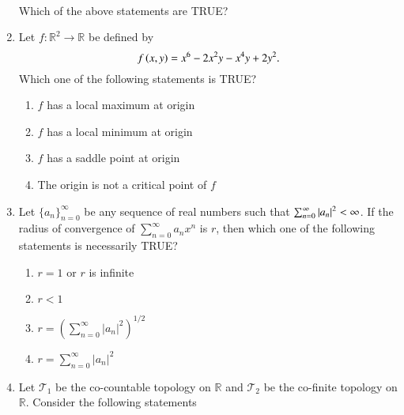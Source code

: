 \documentclass[journal,12pt,onecolumn]{IEEEtran}
\theoremstyle{remark}
\begin{document}
\begin{enumerate}[start=1, label=Q.\arabic*]
 \\
Which of the above statements are TRUE?
\begin{enumerate}
\end{enumerate}

\hfill{}


\item Let $f : \mathbb{R}^2 \to \mathbb{R}$ be defined by
\[
f\left(x,y\right) = x^6 - 2x^2 y - x^4 y + 2y^2.
\]
Which one of the following statements is TRUE?
\begin{enumerate}
\item $f$ has a local maximum at origin
\item $f$ has a local minimum at origin
\item $f$ has a saddle point at origin
\item The origin is not a critical point of $f$
\end{enumerate}

\hfill{}

\item Let \(\{a_n\}_{n=0}^{\infty}\) be any sequence of real numbers such that \(\sum_{n=0}^{\infty} \left\vert a_n\right\vert^2 < \infty\).
If the radius of convergence of \(\sum_{n=0}^{\infty} a_n x^n\) is \(r\), then which one of the following statements is necessarily TRUE?
\begin{enumerate}
\item $r = 1$ or $r$ is infinite  
\item $r < 1$  
\item $r = \left( \sum_{n=0}^{\infty} |a_n|^2 \right)^{1/2}$ 
\item $r = \sum_{n=0}^{\infty} |a_n|^2$
\end{enumerate}

\hfill{}

\item Let $\mathcal{T}_1$ be the co-countable topology on $\mathbb{R}$ and $\mathcal{T}_2$ be the co-finite topology on $\mathbb{R}$. Consider the following statements\brak{:}


\end{enumerate}
\end{document}
